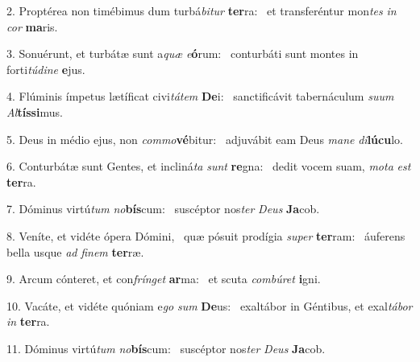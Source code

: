 2. Proptérea non timébimus dum turbá\textit{bi}\textit{tur} \textbf{ter}ra: \ast\  et transferéntur mon\textit{tes} \textit{in} \textit{cor} \textbf{ma}ris.\

3. Sonuérunt, et turbátæ sunt a\textit{quæ} \textit{e}\textbf{ó}rum: \ast\  conturbáti sunt montes in forti\textit{tú}\textit{di}\textit{ne} \textbf{e}jus.\

4. Flúminis ímpetus lætíficat civi\textit{tá}\textit{tem} \textbf{De}i: \ast\  sanctificávit tabernáculum \textit{su}\textit{um} \textit{Al}\textbf{tís}\textbf{si}mus.\

5. Deus in médio ejus, non \textit{com}\textit{mo}\textbf{vé}bitur: \ast\  adjuvábit eam Deus \textit{ma}\textit{ne} \textit{di}\textbf{lú}\textbf{cu}lo.\

6. Conturbátæ sunt Gentes, et incliná\textit{ta} \textit{sunt} \textbf{re}gna: \ast\  dedit vocem suam, \textit{mo}\textit{ta} \textit{est} \textbf{ter}ra.\

7. Dóminus virtú\textit{tum} \textit{no}\textbf{bís}cum: \ast\  suscéptor nos\textit{ter} \textit{De}\textit{us} \textbf{Ja}cob.\

8. Veníte, et vidéte ópera Dómini, \dag\  quæ pósuit prodígia \textit{su}\textit{per} \textbf{ter}ram: \ast\  áuferens bella usque \textit{ad} \textit{fi}\textit{nem} \textbf{ter}ræ.\

9. Arcum cónteret, et con\textit{frín}\textit{get} \textbf{ar}ma: \ast\  et scuta \textit{com}\textit{bú}\textit{ret} \textbf{i}gni.\

10. Vacáte, et vidéte quóniam e\textit{go} \textit{sum} \textbf{De}us: \ast\  exaltábor in Géntibus, et exal\textit{tá}\textit{bor} \textit{in} \textbf{ter}ra.\

11. Dóminus virtú\textit{tum} \textit{no}\textbf{bís}cum: \ast\  suscéptor nos\textit{ter} \textit{De}\textit{us} \textbf{Ja}cob.\


